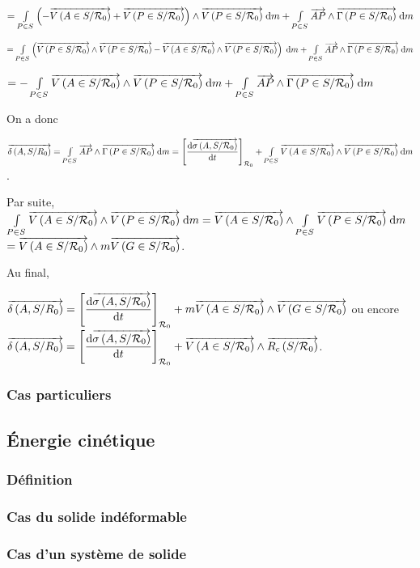 \documentclass[10pt,fleqn]{article} %
\begin{document}
$=\int\limits_{P\in S} \left(-\vectv{A}{S}{\rep{0}} + \vectv{P}{S}{\rep{0}}\right)\wedge \vectv{P}{S}{\rep{0}}\; \dd m 
+ \int\limits_{P\in S}  \vect{AP}\wedge \vectg{P}{S}{\rep{0}} \; \dd m$

$=\int\limits_{P\in S} \left(\vectv{P}{S}{\rep{0}} \wedge \vectv{P}{S}{\rep{0}}-\vectv{A}{S}{\rep{0}}\wedge \vectv{P}{S}{\rep{0}}  \right)\; \dd m 
+ \int\limits_{P\in S}  \vect{AP}\wedge \vectg{P}{S}{\rep{0}} \; \dd m$

$=-\int\limits_{P\in S} \vectv{A}{S}{\rep{0}}\wedge \vectv{P}{S}{\rep{0}} \; \dd m 
+ \int\limits_{P\in S}  \vect{AP}\wedge \vectg{P}{S}{\rep{0}} \; \dd m$

On a donc 

$ \vectmd{A}{S}{R_0}= \int\limits_{P\in S}  \vect{AP}\wedge \vectg{P}{S}{\rep{0}} \; \dd m = 
\left[ \dfrac{\dd \vectmc{A}{S}{\rep{0}}}{\dd t} \right]_{\rep{0}} + \int\limits_{P\in S} \vectv{A}{S}{\rep{0}}\wedge \vectv{P}{S}{\rep{0}} \; \dd m $.

Par suite, $\int\limits_{P\in S} \vectv{A}{S}{\rep{0}}\wedge \vectv{P}{S}{\rep{0}} \; \dd m =\vectv{A}{S}{\rep{0}}\wedge \int\limits_{P\in S}  \vectv{P}{S}{\rep{0}} \; \dd m  $
$=\vectv{A}{S}{\rep{0}}\wedge m \vectv{G}{S}{\rep{0}} $.

Au final, 

$ \vectmd{A}{S}{R_0}= \left[ \dfrac{\dd \vectmc{A}{S}{\rep{0}}}{\dd t} \right]_{\rep{0}} +m \vectv{A}{S}{\rep{0}}\wedge  \vectv{G}{S}{\rep{0}} $ ou encore 
$ \vectmd{A}{S}{R_0}= \left[ \dfrac{\dd \vectmc{A}{S}{\rep{0}}}{\dd t} \right]_{\rep{0}} + \vectv{A}{S}{\rep{0}}\wedge  \vectrc{S}{\rep{0}} $.

\subsubsection{Cas particuliers}

\subsection{Énergie cinétique}
\subsubsection{Définition}
\subsubsection{Cas du solide indéformable}
\subsubsection{Cas d'un système de solide}
\end{document}

